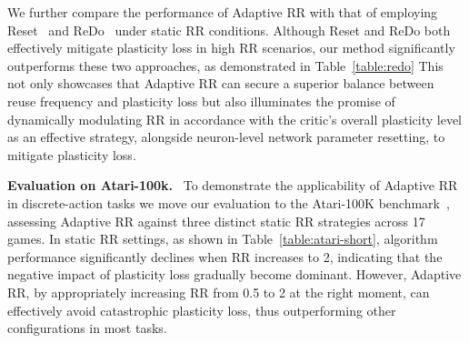 \vspace{-0.5\baselineskip}
We further compare the performance of Adaptive RR with that of employing Reset~\citep{primacy_bias} and ReDo~\citep{dormant_neuron} under static RR conditions.
Although Reset and ReDo both effectively mitigate plasticity loss in high RR scenarios, our method significantly outperforms these two approaches, as demonstrated in Table~\ref{table:redo}
This not only showcases that Adaptive RR can secure a superior balance between reuse frequency and plasticity loss but also illuminates the promise of dynamically modulating RR in accordance with the critic's overall plasticity level as an effective strategy, alongside neuron-level network parameter resetting, to mitigate plasticity loss.

\begin{figure}
\centering
\vspace{-\baselineskip}
\vspace{-0.5\baselineskip}
\renewcommand{\arraystretch}{1.15}
\setlength{\tabcolsep}{2pt}
\end{figure}
\textbf{Evaluation on Atari-100k.}~
To demonstrate the applicability of Adaptive RR in discrete-action tasks we move our evaluation to the Atari-100K benchmark~\citep{kaiser2019model}, assessing Adaptive RR against three distinct static RR strategies across 17 games.
In static RR settings, as shown in Table~\ref{table:atari-short}, algorithm performance significantly declines when RR increases to 2, indicating that the negative impact of plasticity loss gradually become dominant.
However, Adaptive RR, by appropriately increasing RR from 0.5 to 2 at the right moment, can effectively avoid catastrophic plasticity loss, thus outperforming other configurations in most tasks.